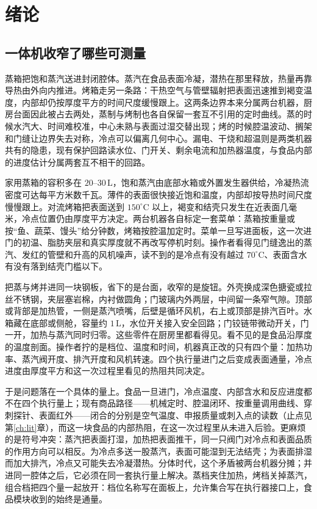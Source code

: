 \chapter{绪论}
\label{ch:intro}

\section{一体机收窄了哪些可测量}

蒸箱把饱和蒸汽送进封闭腔体。蒸汽在食品表面冷凝，潜热在那里释放，热量再靠导热由外向内推进。烤箱走另一条路：干热空气与管壁辐射把表面迅速推到褐变温度，内部却仍按厚度平方的时间尺度缓慢跟上。这两条边界本来分属两台机器，厨房台面因此被占去两处，蒸制与烤制也各自保留一套互不引用的定时曲线。蒸的时候水汽大、时间难校准，中心未熟与表面过湿交替出现；烤的时候腔温波动、搁架和门缝让边界失去对称，冷点可以偏离几何中心\cite{feyissa2013}。漏电、干烧和超温则是两类机器共有的隐患，现有保护回路读水位、门开关、剩余电流和加热器温度，与食品内部的进度估计分属两套互不相干的回路。

家用蒸箱的容积多在 \(20\)--\(30\,\mathrm{L}\)，饱和蒸汽由底部水箱或外置发生器供给，冷凝热流密度可达每平方米数千瓦。薄件的表面很快接近饱和温度，内部却按导热时间尺度慢慢跟上。对流烤箱把表面送到 \(150^\circ\mathrm{C}\) 以上，褐变和结壳只发生在近表面几毫米，冷点位置仍由厚度平方决定。两台机器各自标定一套菜单：蒸箱按重量或按“鱼、蔬菜、馒头”给分钟数，烤箱按腔温加定时。菜单一旦写进面板，这一次进门的初温、脂肪夹层和真实厚度就不再改写停机时刻。操作者看得见门缝逸出的蒸汽、发红的管壁和升高的风机噪声，读不到的是冷点有没有越过 \(70^\circ\mathrm{C}\)、表面含水有没有落到结壳门槛以下。

把蒸与烤并进同一块钢板，省下的是台面，收窄的是旋钮。外壳换成深色搪瓷或拉丝不锈钢，夹层塞岩棉，内衬做圆角；门玻璃内外两层，中间留一条窄气隙。顶部或背部是加热管，一侧是蒸汽喷嘴，后壁是循环风机，右上或顶部是排汽百叶。水箱藏在底部或侧舱，容量约 \(1\,\mathrm{L}\)，水位开关接入安全回路；门铰链带微动开关，门一开，加热与蒸汽同时归零。这些零件在厨房里都看得见。看不见的是食品沿厚度的温度剖面。操作者拧的是档位、温度和时间，机器真正改的只有四个量：加热功率、蒸汽阀开度、排汽开度和风机转速。四个执行量进门之后变成表面通量，冷点进度由厚度平方和这一次过程里看见的热阻共同决定。

于是问题落在一个具体的量上。食品一旦进门，冷点温度、内部含水和反应进度都不在四个执行量上；现有商品路径——机械定时、腔温闭环、按重量调用曲线、穿刺探针、表面红外——闭合的分别是空气温度、申报质量或刺入点的读数（止点见第\ref{ch:lit}{}章），而这一块食品的内部热阻，在这一次过程里从未进入后验。更麻烦的是符号冲突：蒸汽把表面打湿，加热把表面推干，同一只阀门对冷点和表面品质的作用方向可以相反。为冷点多送一股蒸汽，表面可能湿到无法结壳；为表面排湿而加大排汽，冷点又可能失去冷凝潜热。分体时代，这个矛盾被两台机器分摊；并进同一腔体之后，它必须在同一套执行量上解决。蒸档夹住加热，烤档关掉蒸汽，组合档把四个量一起放开：档位名称写在面板上，允许集合写在执行器接口上，食品模块收到的始终是通量。

